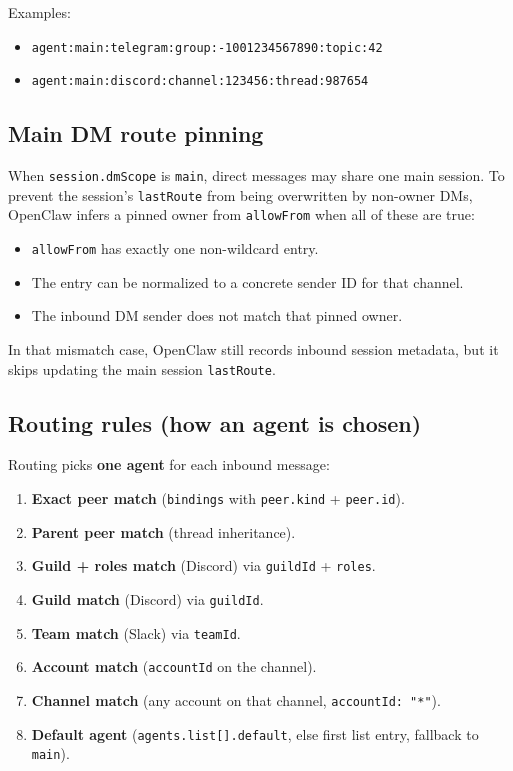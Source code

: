 Examples:

\begin{itemize}
  \item \texttt{agent:main:telegram:group:-1001234567890:topic:42}
  \item \texttt{agent:main:discord:channel:123456:thread:987654}
\end{itemize}


\subsection{Main DM route pinning}


When \texttt{session.dmScope} is \texttt{main}, direct messages may share one main session.
To prevent the session’s \texttt{lastRoute} from being overwritten by non-owner DMs,
OpenClaw infers a pinned owner from \texttt{allowFrom} when all of these are true:

\begin{itemize}
  \item \texttt{allowFrom} has exactly one non-wildcard entry.
  \item The entry can be normalized to a concrete sender ID for that channel.
  \item The inbound DM sender does not match that pinned owner.
\end{itemize}


In that mismatch case, OpenClaw still records inbound session metadata, but it
skips updating the main session \texttt{lastRoute}.

\subsection{Routing rules (how an agent is chosen)}


Routing picks \textbf{one agent} for each inbound message:

\begin{enumerate}
  \item \textbf{Exact peer match} (\texttt{bindings} with \texttt{peer.kind} + \texttt{peer.id}).
  \item \textbf{Parent peer match} (thread inheritance).
  \item \textbf{Guild + roles match} (Discord) via \texttt{guildId} + \texttt{roles}.
  \item \textbf{Guild match} (Discord) via \texttt{guildId}.
  \item \textbf{Team match} (Slack) via \texttt{teamId}.
  \item \textbf{Account match} (\texttt{accountId} on the channel).
  \item \textbf{Channel match} (any account on that channel, \texttt{accountId: "*"}).
  \item \textbf{Default agent} (\texttt{agents.list[].default}, else first list entry, fallback to \texttt{main}).
\end{enumerate}


